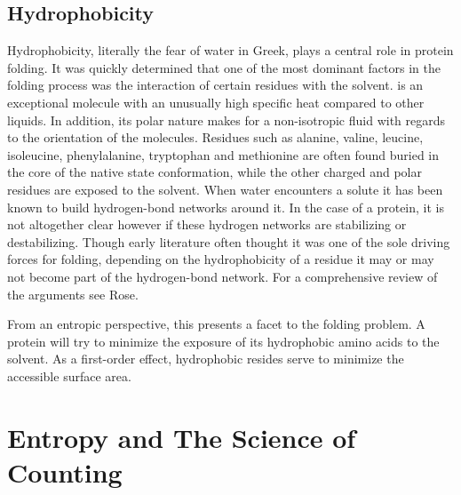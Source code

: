 \subsection{Hydrophobicity}

Hydrophobicity, literally the fear of water in Greek, plays a central role in protein folding.  It was quickly determined that one of the most dominant factors in the folding process was the interaction of certain residues with the solvent.  is an exceptional molecule with an unusually high specific heat compared to other liquids. In addition, its polar nature makes for a non-isotropic fluid with regards to the orientation of the molecules. Residues such as alanine, valine, leucine, isoleucine, phenylalanine, tryptophan and methionine are often found buried in the core of the native state conformation, while the other charged and polar residues are exposed to the solvent.\cite{pace_forces_1996} When water encounters a solute it has been known to build hydrogen-bond networks around it.\cite{lodish_molecular_2004} In the case of a protein, it is not altogether clear however if these hydrogen networks are stabilizing or destabilizing. Though early literature often thought it was one of the sole driving forces for folding, depending on the hydrophobicity of a residue it may or may not become part of the hydrogen-bond network. For a comprehensive review of the arguments see Rose.\cite{rose_hydrogen_1993}

From an entropic perspective, this presents a facet to the folding problem. A protein will try to minimize the exposure of its hydrophobic amino acids to the solvent. As a first-order effect, hydrophobic resides serve to minimize the accessible surface area.

\section{Entropy and The Science of Counting}

